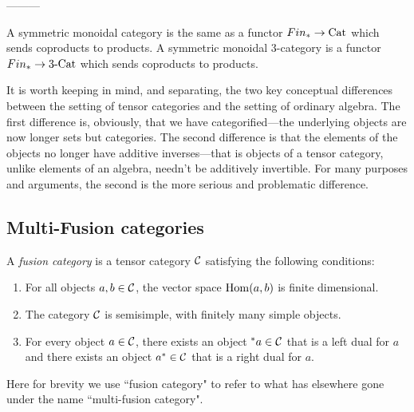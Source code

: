 \documentclass{amsart}
\begin{document}
---------


A symmetric monoidal category is the same as a functor $Fin_* \to \mathrm{Cat}$ which sends coproducts to products. A symmetric monoidal 3-category is a functor $Fin_* \to 3\text{-}\mathrm{Cat}$ which sends coproducts to products.



\begin{remark}
It is worth keeping in mind, and separating, the two key conceptual differences between the setting of tensor categories and the setting of ordinary algebra.  The first difference is, obviously, that we have categorified---the underlying objects are now longer sets but categories.  The second difference is that the elements of the objects no longer have additive inverses---that is objects of a tensor category, unlike elements of an algebra, needn't be additively invertible.  For many purposes and arguments, the second is the more serious and problematic difference.
\end{remark}

\subsection{Multi-Fusion categories} \label{sec-tc-fusion}


\begin{definition}
A \emph{fusion category} is a tensor category $\mathcal C$ satisfying the following conditions:
\begin{enumerate}
\item For all objects $a, b \in \mathcal C$, the vector space $\operatorname{Hom}(a,b)$ is finite dimensional.
\item The category $\mathcal C$ is semisimple, with finitely many simple objects.
\item For every object $a \in \mathcal C$, there exists an object ${}^*{a} \in \mathcal C$ that is a left dual for $a$ and there exists an object ${a}^* \in \mathcal C$ that is a right dual for $a$.
\end{enumerate}
\end{definition}

\begin{remark}
Here for brevity we use ``fusion category" to refer to what has elsewhere gone under the name ``multi-fusion category".
\end{remark}
\end{document}

